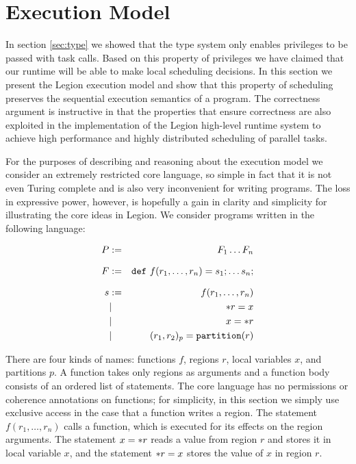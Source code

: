 
\section{Execution Model}
\label{sec:exec}


In section \ref{sec:type} we showed that the type system
only enables privileges to be passed with task calls.  Based on
this property of privileges we have claimed that our runtime
will be able to make local scheduling decisions.  In this
section we present the Legion execution model and show that
this property of scheduling preserves the sequential execution 
semantics of a program.  The correctness argument is
instructive in that the properties that ensure correctness are also
exploited in the implementation of the Legion high-level runtime
system to achieve high performance and highly distributed scheduling
of parallel tasks.

For the purposes of describing and reasoning about the
execution model we consider an extremely restricted core language, so
simple in fact that it is not even Turing complete and is also very
inconvenient for writing programs.  The loss in expressive power, however,
is hopefully a gain in clarity and simplicity for illustrating the core ideas in
Legion.    We consider programs written in the following language:

\begin{eqnarray*}
P & := & F_1 \ldots F_n \\[.1in]
F & := & \mbox{\tt def}\ f(r_1,\ldots,r_n) =   s_1; \ldots s_n; \\[.1in]
s & := & f(r_1,\ldots,r_n) \\
&| & \ast r = x \\
& | & x = \ast r \\
&| & (r_1, r_2)_{p} = \mbox{\tt partition}(r) \\ 
\end{eqnarray*}

There are four kinds of names: functions $f$, regions $r$, local
variables $x$, and partitions $p$.  A function takes only regions as
arguments and a function body consists of an ordered list of
statements.  The core language has no permissions or coherence annotations
on functions; for simplicity, in this section we simply use exclusive access in the case
that a function writes a region.  The statement $f(r_1,\ldots,r_n)$ calls a function, which
is executed for its effects on the region arguments.  The statement $x
= \ast r$ reads a value from region $r$ and stores it in local
variable $x$, and the statement $\ast r = x$ stores the value of $x$
in region $r$.  

